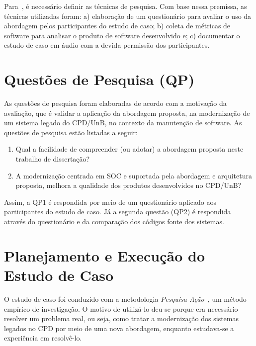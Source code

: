 


Para~\cite{van1999goal}, é necessário definir as técnicas
de pesquisa. Com base nessa
premissa, as técnicas utilizadas foram: a) elaboração
de um questionário para 
avaliar o uso da abordagem pelos participantes do
estudo de caso; b) coleta 
de métricas de software para analisar o produto de
software desenvolvido e; 
c) documentar o estudo de caso em áudio com a devida
permissão dos participantes.



\section{Questões de Pesquisa (QP)}\label{ava:questoes}

As questões de pesquisa foram elaboradas de acordo com a motivação da avaliação, 
que é validar a aplicação da abordagem proposta, na modernização de um
sistema legado do CPD/UnB, no contexto da manutenção de software. As questões de
pesquisa estão listadas a seguir:

\begin{enumerate}[(QP1)]

\item Qual a facilidade de compreender (ou adotar) a abordagem 
proposta neste trabalho de dissertação?

\item A modernização centrada em \acrfull{SOC} e suportada 
pela abordagem e arquitetura proposta, melhora a qualidade dos
produtos desenvolvidos no CPD/UnB?

\end{enumerate}

Assim, a QP1 é respondida por meio de um questionário aplicado aos participantes
do estudo de caso. Já a segunda questão (QP2) é respondida através do
questionário e da comparação dos códigos fonte dos sistemas.






\section{Planejamento e Execução do Estudo de Caso}\label{ava:estudo_caso}

O estudo de caso foi conduzido com a metodologia 
\emph{Pesquisa-Ação}~\cite{santos2009action},
um método empírico de investigação. O motivo de utilizá-lo deu-se porque era
necessário resolver um problema real, ou seja, como tratar a
modernização dos sistemas legados no \acrshort{CPD} por meio de uma 
nova abordagem, enquanto estudava-se a experiência em resolvê-lo. 

